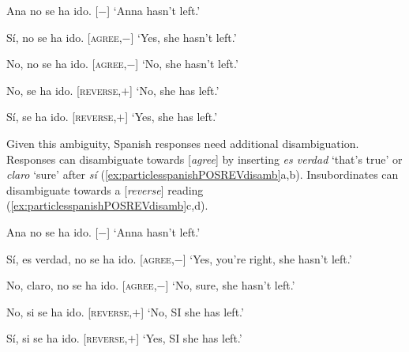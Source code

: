 \begin{exe}
	\ex \label{ex:particlesspanishPOSREV} 
	\begin{xlist}[A:]
	 Ana no se ha ido. \hfill [$-$]
	\glt `Anna hasn't left.' 
	\end{xlist}
	\begin{xlist}
		\ex \begin{xlist}[A:] Sí, no se ha ido. \hfill [\textsc{agree},$-$]
		\glt `Yes, she hasn't left.' \end{xlist}
		\ex \begin{xlist}[A:] No, no se ha ido. \hfill [\textsc{agree},$-$]
		\glt `No, she hasn't left.' \end{xlist}
		\ex \begin{xlist}[A:] No, se ha ido. \hfill [\textsc{reverse},$+$]
		\glt `No, she has left.' \end{xlist}
		\ex \begin{xlist}[A:]  Sí, se ha ido. \hfill [\textsc{reverse},$+$] 
		\glt `Yes, she has left.' \end{xlist}
	\end{xlist}
\end{exe}

Given this ambiguity, Spanish responses need additional disambiguation. Responses can disambiguate towards [\textit{agree}] by inserting \textit{es verdad} `that's true' or \textit{claro} `sure' after \textit{sí} (\ref{ex:particlesspanishPOSREVdisamb}a,b). Insubordinates can disambiguate towards a [\textit{reverse}] reading (\ref{ex:particlesspanishPOSREVdisamb}c,d).\largerpage

\begin{exe}
	\ex \label{ex:particlesspanishPOSREVdisamb} 
	\begin{xlist}[A:]
	 Ana no se ha ido. \hfill [$-$]
	\glt `Anna hasn't left.' 
	\end{xlist}
	\begin{xlist}
		\ex \begin{xlist}[A:] Sí, es verdad, no se ha ido. \hfill [\textsc{agree},$-$]
		\glt `Yes, you're right, she hasn't left.' \end{xlist}
		\ex \begin{xlist}[A:] No, claro, no se ha ido. \hfill [\textsc{agree},$-$]
		\glt `No, sure, she hasn't left.'\end{xlist}
		\ex \begin{xlist}[A:] No, si se ha ido. \hfill [\textsc{reverse},$+$] 
		\glt `No, SI she has left.'\end{xlist}
		\ex \begin{xlist}[A:] Sí, si se ha ido. \hfill [\textsc{reverse},$+$]
		\glt `Yes, SI she has left.' \end{xlist}
	\end{xlist}
\end{exe}

